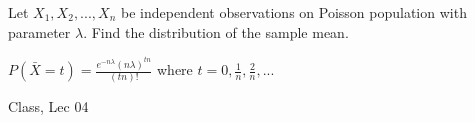 \begin{samepage}
\begin{ex}
Let $X_1, X_2, ..., X_n$ be independent observations on Poisson population with parameter $\lambda$. Find the distribution of the sample mean.
\end{ex}
\begin{ans}
$P(\bar{X} = t) = \displaystyle \frac{e^{-n \lambda} (n \lambda)^{tn}}{(tn)!}$ where $t = 0, \frac{1}{n}, \frac{2}{n}, ...$
\end{ans}
\begin{source}
Class, Lec 04
\end{source}
\end{samepage}
